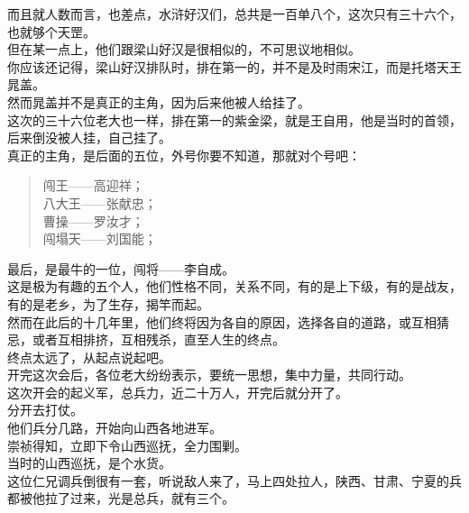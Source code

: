 \begin{multicols}{\theparacolNo}
而且就人数而言，也差点，水浒好汉们，总共是一百单八个，这次只有三十六个，也就够个天罡。\\

但在某一点上，他们跟梁山好汉是很相似的，不可思议地相似。\\

你应该还记得，梁山好汉排队时，排在第一的，并不是及时雨宋江，而是托塔天王晁盖。\\

然而晁盖并不是真正的主角，因为后来他被人给挂了。\\

这次的三十六位老大也一样，排在第一的紫金梁，就是王自用，他是当时的首领，后来倒没被人挂，自己挂了。\\

真正的主角，是后面的五位，外号你要不知道，那就对个号吧：
{\footnotesize \begin{quote}
	闯王——高迎祥；\\
	八大王——张献忠；\\
	曹操——罗汝才；\\
	闯塌天——刘国能；\\
\end{quote}}

最后，是最牛的一位，闯将——李自成。\\

这是极为有趣的五个人，他们性格不同，关系不同，有的是上下级，有的是战友，有的是老乡，为了生存，揭竿而起。\\

然而在此后的十几年里，他们终将因为各自的原因，选择各自的道路，或互相猜忌，或者互相排挤，互相残杀，直至人生的终点。\\

终点太远了，从起点说起吧。\\

开完这次会后，各位老大纷纷表示，要统一思想，集中力量，共同行动。\\

这次开会的起义军，总兵力，近二十万人，开完后就分开了。\\

分开去打仗。\\

他们兵分几路，开始向山西各地进军。\\

崇祯得知，立即下令山西巡抚，全力围剿。\\

当时的山西巡抚，是个水货。\\

这位仁兄调兵倒很有一套，听说敌人来了，马上四处拉人，陕西、甘肃、宁夏的兵都被他拉了过来，光是总兵，就有三个。\\


\end{multicols}
